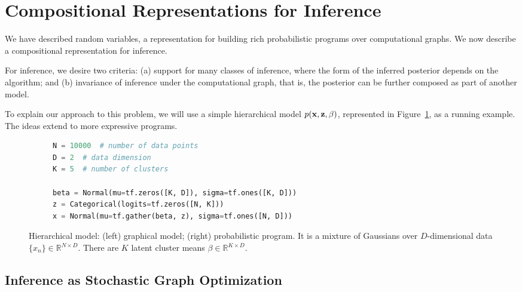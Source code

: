 \section{Compositional Representations for Inference}
\label{sec:inference}

We have described random variables, a representation for building rich
probabilistic programs over computational graphs.  We now describe a
compositional representation for inference.

For inference,
we desire two criteria: (a) support for many classes of inference,
where the form of the inferred posterior depends on the
algorithm; and (b) invariance of inference under the computational
graph, that is, the posterior can be further composed as part of
another model.

To explain our approach to this problem,
we will use a simple  hierarchical model
$p(\boldsymbol{\mathbf{x}}, \boldsymbol{\mathbf{z}}, \beta)$,
represented in Figure~\ref{fig:hierarchical_model_example},
as a running example. The ideas extend to more expressive
programs.

\begin{figure}[!h]
\begin{subfigure}{0.35\columnwidth}
  \centering
  
\end{subfigure}%
\begin{subfigure}{0.6\columnwidth}
  \centering
\begin{lstlisting}[language=python]
N = 10000  # number of data points
D = 2  # data dimension
K = 5  # number of clusters

beta = Normal(mu=tf.zeros([K, D]), sigma=tf.ones([K, D]))
z = Categorical(logits=tf.zeros([N, K]))
x = Normal(mu=tf.gather(beta, z), sigma=tf.ones([N, D]))
\end{lstlisting}
\end{subfigure}
\caption{Hierarchical model: (left) graphical model; (right)
probabilistic program. It is a mixture of Gaussians over
$D$-dimensional data $\{x_n\}\in\mathbb{R}^{N\times D}$. There are $K$
latent cluster means
$\beta\in\mathbb{R}^{K\times D}$.}
\label{fig:hierarchical_model_example}
\end{figure}

\subsection{Inference as Stochastic Graph Optimization}

